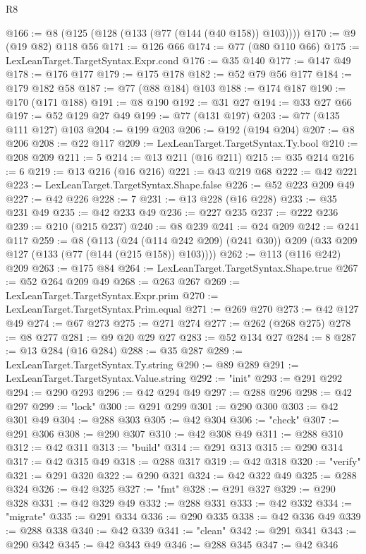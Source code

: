 \begin{lexlean}{R8}
\begin{coremodule}
{{{{{{{{{{{{{{{{{@166 := @8 (@125 (@128 (@133 (@77 (@144 (@40 @158)) @103))))
@170 := @9 (@19 @82) @118 @56
@171 := @126 @66
@174 := @77 (@80 @110 @66)
@175 := LexLeanTarget.TargetSyntax.Expr.cond
@176 := @35 @140
@177 := @147 @49
@178 := @176 @177
@179 := @175 @178
@182 := @52 @79 @56 @177
@184 := @179 @182 @58
@187 := @77 (@88 @184) @103
@188 := @174 @187
@190 := @170 (@171 @188)
@191 := @8 @190
@192 := @31 @27
@194 := @33 @27 @66
@197 := @52 @129 @27 @49
@199 := @77 (@131 @197)
@203 := @77 (@135 @111 @127) @103
@204 := @199 @203
@206 := @192 (@194 @204)
@207 := @8 @206
@208 := @22 @117
@209 := LexLeanTarget.TargetSyntax.Ty.bool
@210 := @208 @209
@211 := 5
@214 := @13 @211 (@16 @211)
@215 := @35 @214
@216 := 6
@219 := @13 @216 (@16 @216)
@221 := @43 @219 @68
@222 := @42 @221
@223 := LexLeanTarget.TargetSyntax.Shape.false
@226 := @52 @223 @209 @49
@227 := @42 @226
@228 := 7
@231 := @13 @228 (@16 @228)
@233 := @35 @231 @49
@235 := @42 @233 @49
@236 := @227 @235
@237 := @222 @236
@239 := @210 (@215 @237)
@240 := @8 @239
@241 := @24 @209
@242 := @241 @117
@259 := @8
    (@113
      (@24 (@114 @242 @209) (@241 @30))
      @209
      (@33 @209 @127 (@133 (@77 (@144 (@215 @158)) @103))))
@262 := @113 (@116 @242) @209
@263 := @175 @84
@264 := LexLeanTarget.TargetSyntax.Shape.true
@267 := @52 @264 @209 @49
@268 := @263 @267
@269 := LexLeanTarget.TargetSyntax.Expr.prim
@270 := LexLeanTarget.TargetSyntax.Prim.equal
@271 := @269 @270
@273 := @42 @127 @49
@274 := @67 @273
@275 := @271 @274
@277 := @262 (@268 @275)
@278 := @8 @277
@281 := @9 @20 @29 @27
@283 := @52 @134 @27
@284 := 8
@287 := @13 @284 (@16 @284)
@288 := @35 @287
@289 := LexLeanTarget.TargetSyntax.Ty.string
@290 := @89 @289
@291 := LexLeanTarget.TargetSyntax.Value.string
@292 := "init"
@293 := @291 @292
@294 := @290 @293
@296 := @42 @294 @49
@297 := @288 @296
@298 := @42 @297
@299 := "lock"
@300 := @291 @299
@301 := @290 @300
@303 := @42 @301 @49
@304 := @288 @303
@305 := @42 @304
@306 := "check"
@307 := @291 @306
@308 := @290 @307
@310 := @42 @308 @49
@311 := @288 @310
@312 := @42 @311
@313 := "build"
@314 := @291 @313
@315 := @290 @314
@317 := @42 @315 @49
@318 := @288 @317
@319 := @42 @318
@320 := "verify"
@321 := @291 @320
@322 := @290 @321
@324 := @42 @322 @49
@325 := @288 @324
@326 := @42 @325
@327 := "fmt"
@328 := @291 @327
@329 := @290 @328
@331 := @42 @329 @49
@332 := @288 @331
@333 := @42 @332
@334 := "migrate"
@335 := @291 @334
@336 := @290 @335
@338 := @42 @336 @49
@339 := @288 @338
@340 := @42 @339
@341 := "clean"
@342 := @291 @341
@343 := @290 @342
@345 := @42 @343 @49
@346 := @288 @345
@347 := @42 @346
}}}}}}}}}}}}}}}}}
\end{coremodule}
\end{lexlean}
